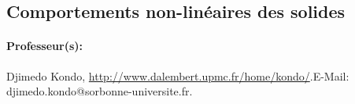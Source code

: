 \subsection{Comportements non-linéaires des solides}

\paragraph{Professeur(s):} Djimedo Kondo, \url{http://www.dalembert.upmc.fr/home/kondo/}.\newline E-Mail: djimedo.kondo@sorbonne-universite.fr.


